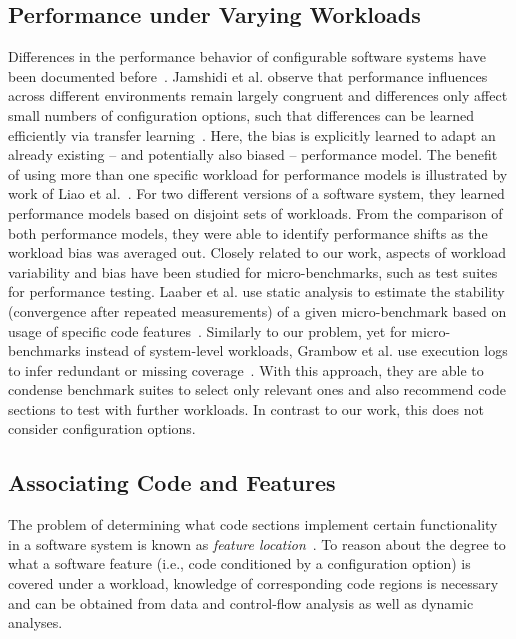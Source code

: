 \subsection{Performance under Varying Workloads}
Differences in the performance behavior of configurable software systems have been documented before~\cite{jamishidi_transfer_2017,alves_sampling_2020}. Jamshidi et al. observe that performance influences across different environments remain largely congruent and differences only affect small numbers of configuration options, such that differences can be learned efficiently via transfer learning~\cite{jamishidi_transfer_2017,jamshidi_learning_2018,jamshidi_transfer_gp_2017,ding_bayesian_2020}. Here, the bias is explicitly learned to adapt an already existing – and potentially also biased -- performance model. The benefit of using more than one specific workload for performance models is illustrated by work of Liao et al.~\cite{liao_2020_using_emse}. For two different versions of a software system, they learned performance models based on disjoint sets of workloads. From the comparison of both performance models, they were able to identify performance shifts as the workload bias was averaged out.
Closely related to our work, aspects of workload variability and bias have been studied for micro-benchmarks, such as test suites for performance testing. Laaber et al. use static analysis to estimate the stability (convergence after repeated measurements) of a given micro-benchmark based on usage of specific code features~\cite{laaber_emse_2021}. Similarly to our problem, yet for micro-benchmarks instead of system-level workloads, Grambow et al. use execution logs to infer redundant or missing coverage~\cite{grambow_peerj_2021}. With this approach, they are able to condense benchmark suites to select only relevant ones and also recommend code sections to test with further workloads. In contrast to our work, this does not consider configuration options.


\subsection{Associating Code and Features}\label{sec:feature_location}
The problem of determining what code sections implement certain functionality in a software system is known as \emph{feature location}~\cite{rubin_feature_2013}. To reason about the degree to what a software feature (i.e., code conditioned by a configuration option) is covered under a workload, knowledge of corresponding code regions is necessary and can be obtained from data and control-flow analysis as well as dynamic analyses.

